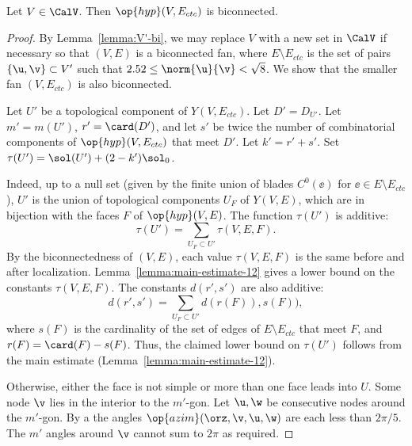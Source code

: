 \begin{lemma}[biconnected]\label{lemma:biconnected}
  Let $V\in \CalV$.  Then $\op{hyp}(V,E_{ctc})$ is biconnected.
\end{lemma}

\begin{proof}
  By Lemma~\ref{lemma:V'-bi}, we may replace $V$ with a new set in
  $\CalV$ if necessary so that $(V,E)$ is a biconnected fan, where
  $E\setminus E_{ctc}$ is the set of pairs $\{\u,\v\}\subset V'$ such
  that $2.52\le\norm{\u}{\v} <\sqrt8$.  We  show that the smaller
  fan $(V,E_{ctc})$ is also biconnected.

  Let $U'$ be a topological component of $Y(V,E_{ctc})$.  Let
  $D'=D_{U'}$.  Let $m'=m(U')$, $r' = \card(D')$, and let $s'$ be
  twice the number of combinatorial components of
  $\op{hyp}(V,E_{ctc})$ that meet $D'$.  Let $k'=r'+s'$.  Set
  $\tau(U') = \sol(U') + (2-k')\sol_0$.

  Indeed,
up to a null set (given by the finite union of blades $C^0(\ee)$ for
$\ee\in E\setminus E_{ctc}$), $U'$ is the union of topological
components $U_F$ of $Y(V,E)$, which are in bijection with the faces
$F$ of $\op{hyp}(V,E)$.  The function $\tau(U')$ is additive:
\[
\tau(U') = \sum_{U_F\subset U'} \tau(V,E,F).
\]
By the biconnectedness of $(V,E)$, each value $\tau(V,E,F)$ is the
same before and after localization.
Lemma~\ref{lemma:main-estimate-12} gives a lower bound on the
constants $\tau(V,E,F)$.  The constants $d(r',s')$ are also additive:
\[
d(r',s') = \sum_{U_F\subset U'} d(r(F)),s(F)),
\]
where $s(F)$ is the cardinality of the set of edges of $E\setminus
E_{ctc}$ that meet $F$, and $r(F) = \card(F)-s(F)$.  Thus, the claimed
lower bound on $\tau(U')$ follows from the main estimate
(Lemma~\ref{lemma:main-estimate-12}).


 Otherwise, either
the face is not simple or  more than one face  leads into
$U$.  Some node $\v$ lies in the interior to the $m'$-gon.  Let
$\u,\w$ be consecutive nodes around the $m'$-gon.  By a
the angles $\op{azim}(\orz,\v,\u,\w)$ are each less than $2\pi/5$. The
$m'$ angles around $\v$ cannot sum to $2\pi$ as required.


\end{proof}
